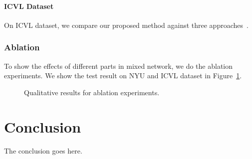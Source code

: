 \documentclass[journal,comsoc]{IEEEtran}
\let\MYoriglatexcaption\caption
\renewcommand{\caption}[2][\relax]{\MYoriglatexcaption[#2]{#2}}
\begin{document}
\paragraph{ICVL Dataset}\label{sec:icvl dataset}
On ICVL dataset, we compare our proposed method against three approaches~\cite{tang2014latent,oberweger2015hands,zhou2016model}.
\subsubsection{Ablation}\label{sec:ablation}
To show the effects of different parts in mixed network, we do the ablation experiments. We
show the test result on NYU and ICVL dataset in Figure~\ref{fig:Qualitative result ablation}.

\begin{figure}[t]\footnotesize
\centering
    \caption{Qualitative results for ablation experiments.}
    \label{fig:Qualitative result ablation}
\end{figure}

\section{Conclusion}\label{sec:conclusion}
The conclusion goes here.

%
%
\end{document}
